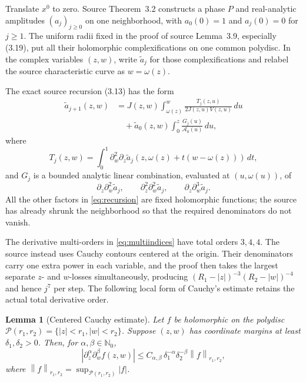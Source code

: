 \documentclass[11pt]{article}
\newtheorem{lemma}{Lemma}
\newcommand{\norm}[1]{\left\lVert#1\right\rVert}
\begin{document}
Translate $x^0$ to zero.  Source Theorem~3.2 constructs a phase $P$ and
real-analytic amplitudes $(a_j)_{j\geq0}$ on one neighborhood, with
$a_0(0)=1$ and $a_j(0)=0$ for $j\geq1$.  The uniform radii fixed in the proof
of source Lemma~3.9, especially (3.19), put all their holomorphic
complexifications on one common polydisc.  In the complex variables $(z,w)$,
write $\widetilde a_j$ for those complexifications and relabel the source
characteristic curve as $w=\omega(z)$.

The exact source recursion (3.13) has the form
\begin{equation}\label{eq:recursion}
\begin{split}
 \widetilde a_{j+1}(z,w)
 &=J(z,w)\int_{\omega(z)}^w
   \frac{T_j(z,u)}{2J(z,u)V(z,u)}\,du\\
 &\quad+\widetilde a_0(z,w)\int_0^z
   \frac{G_j(u)}{\mathcal A_0(u)}\,du,
\end{split}
\end{equation}
where
\[
 T_j(z,w)=\int_0^1
 \partial_w^2\partial_z\widetilde a_j
   (z,\omega(z)+t(w-\omega(z)))\,dt,
\]
and $G_j$ is a bounded analytic linear combination, evaluated at
$(u,\omega(u))$, of
\begin{equation}\label{eq:multiindices}
 \partial_z\partial_w^2\widetilde a_j,
 \qquad
 \partial_z^2\partial_w^2\widetilde a_j,
 \qquad
 \partial_z\partial_w^3\widetilde a_j.
\end{equation}
All the other factors in \eqref{eq:recursion} are fixed holomorphic functions;
the source has already shrunk the neighborhood so that the required
denominators do not vanish.

The derivative multi-orders in \eqref{eq:multiindices} have total orders
$3,4,4$.  The source instead uses Cauchy contours centered at the origin.
Their denominators carry one extra power in each variable, and the proof then
takes the largest separate $z$- and $w$-losses simultaneously, producing
$(R_1-|z|)^{-3}(R_2-|w|)^{-4}$ and hence $j^7$ per step.  The following local
form of Cauchy's estimate retains the actual total derivative order.

\begin{lemma}[Centered Cauchy estimate]\label{lem:cauchy}
Let $f$ be holomorphic on the polydisc
$\mathcal P(r_1,r_2)=\{|z|<r_1,|w|<r_2\}$.  Suppose
$(z,w)$ has coordinate margins at least $\delta_1,\delta_2>0$.  Then, for
$\alpha,\beta\in\mathbb N_0$,
\[
 |\partial_z^\alpha\partial_w^\beta f(z,w)|
 \leq C_{\alpha,\beta}\,
 \delta_1^{-\alpha}\delta_2^{-\beta}
 \norm{f}_{r_1,r_2},
\]
where $\norm{f}_{r_1,r_2}=\sup_{\mathcal P(r_1,r_2)}|f|$.
\end{lemma}
\end{document}

